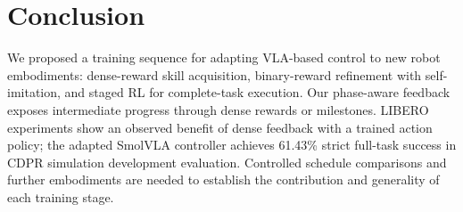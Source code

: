 \section{Conclusion}\label{sec:conclusion}
We proposed a training sequence for adapting VLA-based control to new robot embodiments: dense-reward skill acquisition, binary-reward refinement with self-imitation, and staged RL for complete-task execution. Our phase-aware feedback exposes intermediate progress through dense rewards or milestones. LIBERO experiments show an observed benefit of dense feedback with a trained action policy; the adapted SmolVLA controller achieves 61.43\% strict full-task success in CDPR simulation development evaluation.  Controlled schedule comparisons and further embodiments are needed to establish the contribution and generality of each training stage.
